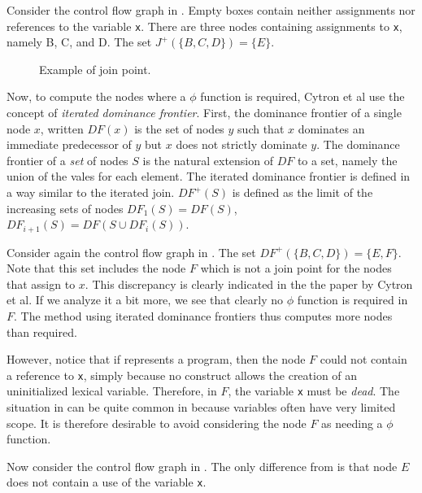 Consider the control flow graph in .  Empty
boxes contain neither assignments nor references to the variable
\texttt{x}.  There are three nodes containing assignments to
\texttt{x}, namely B, C, and D.  The set $J^+(\{B, C, D\}) = \{E\}$.

\begin{figure}
\begin{center}
\end{center}
\caption{\label{fig-ssa-join-1}
Example of join point.}
\end{figure}

Now, to compute the nodes where a $\phi$ function is required, Cytron
et al use the concept of \emph{iterated dominance frontier}.  First,
the dominance frontier of a single node $x$, written $DF(x)$ is the
set of nodes $y$ such that $x$ dominates an immediate predecessor of
$y$ but $x$ does not strictly dominate $y$.  The dominance frontier of
a \emph{set} of nodes $S$ is the natural extension of $DF$ to a set,
namely the union of the vales for each element.  The iterated
dominance frontier is defined in a way similar to the iterated join. 
$DF^+(S)$ is defined as the limit of the
increasing sets of nodes $DF_1(S) = DF(S)$, $DF_{i+1}(S) = DF(S \cup
DF_i(S))$.

Consider again the control flow graph in .  The
set $DF^+(\{B, C, D\}) = \{E, F\}$.  Note that this set includes the
node $F$ which is not a join point for the nodes that assign to $x$.
This discrepancy is clearly indicated in the the paper by Cytron et
al.  If we analyze it a bit more, we see that clearly no $\phi$
function is required in $F$.  The method using iterated dominance
frontiers thus computes more nodes than required.  

However, notice that if  represents a \cl{}
program, then the node $F$ could not contain a reference to
\texttt{x}, simply because no \cl{} construct allows the creation of
an uninitialized lexical variable.  Therefore, in $F$, the variable
\texttt{x} must be \emph{dead}.  The situation in
 can be quite common in \cl{} because variables
often have very limited scope.  It is therefore desirable to avoid
considering the node $F$ as needing a $\phi$ function.

Now consider the control flow graph in .  The
only difference from  is that node $E$ does not
contain a use of the variable \texttt{x}.

